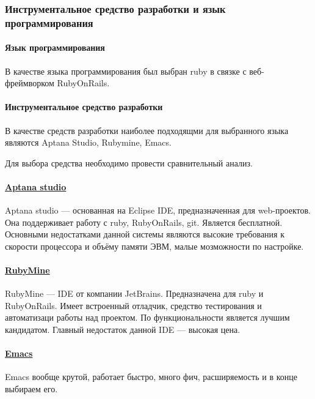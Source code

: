 \subsubsection{Инструментальное средство разработки и язык программирования}

\paragraph{Язык программирования}

В качестве языка программирования был выбран ruby в связке с веб-фреймворком RubyOnRails.

\paragraph{Инструментальное средство разработки}


В качестве средств разработки наиболее подходящми для выбранного языка являются Aptana Studio, Rubymine, Emacs.

Для выбора средства необходимо провести сравнительный анализ.

\paragraph{\href{http://aptana.com/}{Aptana studio}}

Aptana studio --- основанная на Eclipse IDE, предназначенная для web-проектов. Она поддерживает работу с ruby, RubyOnRails, git. Является бесплатной. Основными недостатками данной системы являются высокие требования к скорости процессора и объёму памяти ЭВМ, малые мозможности по настройке.

\paragraph{\href{http://www.jetbrains.com/ruby/}{RubyMine}}

RubyMine --- IDE от компании JetBrains. Предназначена для ruby и RubyOnRails. Имеет встроенный отладчик, средство тестирования и автоматизаци работы над проектом. По функциональности является лучшим кандидатом. Главный недостаток данной IDE --- высокая цена.

\paragraph{\href{http://www.gnu.org/software/emacs/}{Emacs}}

Emacs вообще крутой, работает быстро, много фич, расширяемость и в конце выбираем его.
